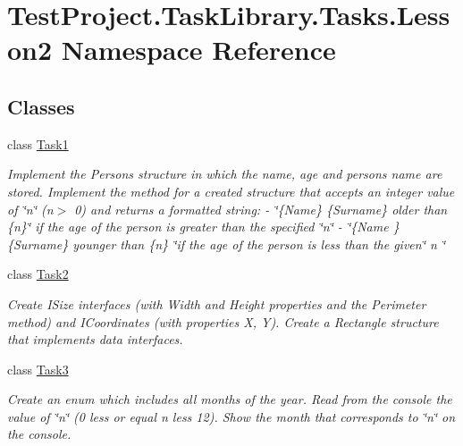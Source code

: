 \hypertarget{namespace_test_project_1_1_task_library_1_1_tasks_1_1_lesson2}{}\section{Test\+Project.\+Task\+Library.\+Tasks.\+Lesson2 Namespace Reference}
\label{namespace_test_project_1_1_task_library_1_1_tasks_1_1_lesson2}
\subsection*{Classes}
\begin{DoxyCompactItemize}
\item 
class \mbox{\hyperlink{class_test_project_1_1_task_library_1_1_tasks_1_1_lesson2_1_1_task1}{Task1}}
\begin{DoxyCompactList}\small\item\em Implement the Person\textquotesingle{}s structure in which the name, age and person\textquotesingle{}s name are stored. Implement the method for a created structure that accepts an integer value of \char`\"{}n\char`\"{} (n$>$ 0) and returns a formatted string\+: -\/ \char`\"{}\{\+Name\} \{\+Surname\}
older than \{n\}\char`\"{} if the age of the person is greater than the specified \char`\"{}n\char`\"{} -\/ \char`\"{}\{\+Name \} \{\+Surname\} younger than \{n\} \char`\"{}if the age of the person is less than the given\char`\"{} n \char`\"{} \end{DoxyCompactList}\item 
class \mbox{\hyperlink{class_test_project_1_1_task_library_1_1_tasks_1_1_lesson2_1_1_task2}{Task2}}
\begin{DoxyCompactList}\small\item\em Create I\+Size interfaces (with Width and Height properties and the Perimeter method) and I\+Coordinates (with properties X, Y). Create a Rectangle structure that implements data interfaces. \end{DoxyCompactList}\item 
class \mbox{\hyperlink{class_test_project_1_1_task_library_1_1_tasks_1_1_lesson2_1_1_task3}{Task3}}
\begin{DoxyCompactList}\small\item\em Create an enum which includes all months of the year. Read from the console the value of \char`\"{}n\char`\"{} (0 less or equal n less 12). Show the month that corresponds to \char`\"{}n\char`\"{} on the console. \end{DoxyCompactList}\item 

\end{DoxyCompactItemize}
